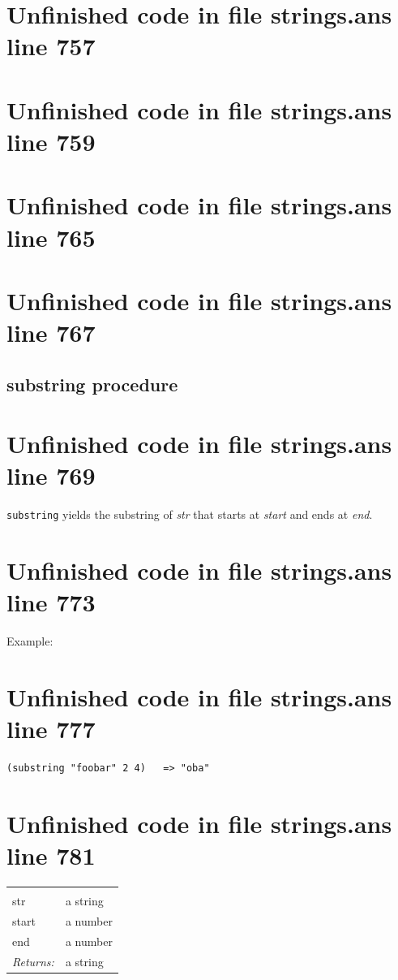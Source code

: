 \documentclass[twoside,9pt]{report}
\begin{document}
\section{Unfinished code in file strings.ans line 757}
\section{Unfinished code in file strings.ans line 759}
\section{Unfinished code in file strings.ans line 765}
\section{Unfinished code in file strings.ans line 767}
\subsection{substring procedure}
\label{substring-procedure}
\section{Unfinished code in file strings.ans line 769}


\texttt{substring} yields the substring of \emph{str} that starts at \emph{start} and ends at \emph{end}.

\section{Unfinished code in file strings.ans line 773}


Example:

\section{Unfinished code in file strings.ans line 777}
\begin{verbatim}
(substring "foobar" 2 4)   => "oba"
\end{verbatim}
\section{Unfinished code in file strings.ans line 781}
\noindent\begin{tabular}{ |p{1.9cm} p{8cm}| }
\hline
\rowcolor[HTML]{CCCCCC} \multicolumn{2}{|l|}{\bf substring (public)} \\
str & a string \\
start & a number \\
end & a number \\
\textit{Returns:} & a string \\
\hline
\end{tabular}
\end{document}
